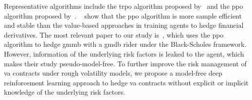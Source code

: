 Representative algorithms include the \gls{trpo} algorithm proposed by~\cite{schulman2015trust} and the \gls{ppo} algorithm proposed by~\cite{schulman2017proximal}.
~\cite{du2020deep} show that the \gls{ppo} algorithm is more sample efficient and stable than the value-based approaches in training agents to hedge financial derivatives.
The most relevant paper to our study is~\cite{chong2023pseudo}, which uses the \gls{ppo} algorithm to hedge \gls{gmmb} with a \gls{gmdb} rider under the Black-Scholes framework.
However, information of the underlying risk factors is leaked to the agent, which makes their study pseudo-model-free.
To further improve the risk management of \gls{va} contracts under rough volatility models, we propose a model-free deep reinforcement learning approach to hedge \gls{va} contracts without explicit or implicit knowledge of the underlying risk factors.

